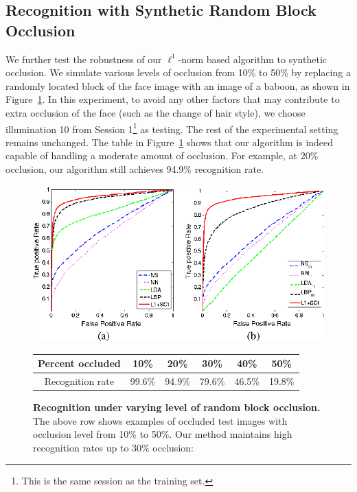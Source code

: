\documentclass[10pt,journal,letterpaper,compsoc]{IEEEtran}
\begin{document}
\subsection{Recognition with Synthetic Random Block Occlusion}

We further test the robustness of our $\ell^1$-norm based
algorithm to synthetic occlusion. We simulate various levels of
occlusion from 10\% to 50\% by replacing a randomly located
block of the face image with an image of a baboon, as shown in
Figure~\ref{fig:multipie-occ-rec}. In this experiment, to avoid
any other factors that may contribute to extra occlusion of the
face (such as the change of hair style), we choose illumination
10 from Session 1\footnote{This is the same session as the
training set.} as testing. The rest of the experimental setting
remains unchanged. The table in
Figure~\ref{fig:multipie-occ-rec} shows that our algorithm is
indeed capable of handling a moderate amount of occlusion. For
example, at 20\% occlusion, our algorithm still achieves 94.9\%
recognition rate.

\begin{figure}
\includegraphics{Figure_11}
\vspace{-1mm}
\caption{{\bf Recognition under varying level of
random block occlusion.} The above row shows examples of occluded test images with occlusion level from 10\% to 50\%. Our method maintains high recognition rates up to 30\% occlusion:}
\vspace{2mm}
{\small
\begin{tabular}{|c|c|c|c|c|c| }
\hline
Percent occluded & 10\% & 20\% & 30\% & 40\% & 50\%  \\
\hline
Recognition rate & 99.6\% & 94.9\% & 79.6\% & 46.5\% & 19.8\% \\
\hline
\end{tabular}
}
\label{fig:multipie-occ-rec}
\vspace{-.3in}
\end{figure}
\end{document}
